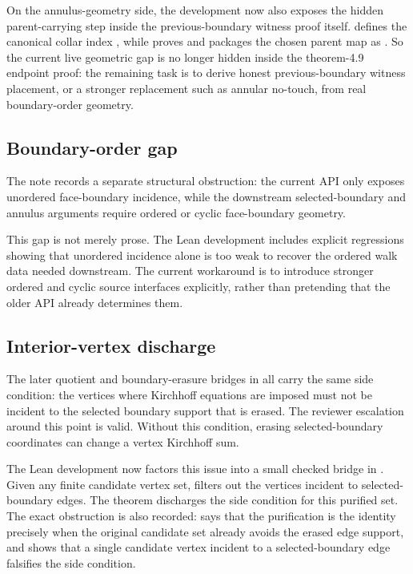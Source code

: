 \documentclass[11pt]{article}
\begin{document}
On the annulus-geometry side, the development now also exposes the hidden
parent-carrying step inside the previous-boundary witness proof itself.
 defines the canonical
collar index
,
while
proves
and packages the chosen parent map as
.
So the current live geometric gap is no longer hidden inside the theorem-4.9
endpoint proof: the remaining task is to derive honest previous-boundary
witness placement, or a stronger replacement such as annular no-touch, from
real boundary-order geometry.

\subsection{Boundary-order gap}

The note
records a separate structural obstruction: the current
 API only exposes unordered face-boundary
incidence, while the downstream selected-boundary and annulus arguments require
ordered or cyclic face-boundary geometry.

This gap is not merely prose.  The Lean development includes explicit
regressions showing that unordered incidence alone is too weak to recover the
ordered walk data needed downstream.  The current workaround is to introduce
stronger ordered and cyclic source interfaces explicitly, rather than pretending
that the older API already determines them.

\subsection{Interior-vertex discharge}

The later quotient and boundary-erasure bridges in
 all carry the same side condition: the
vertices where Kirchhoff equations are imposed must not be incident to the
selected boundary support that is erased.  The reviewer escalation around this
point is valid.  Without this condition, erasing selected-boundary coordinates
can change a vertex Kirchhoff sum.

The Lean development now factors this issue into a small checked bridge in
.  Given any finite candidate vertex set,
 filters out the vertices incident to
selected-boundary edges.  The theorem
discharges the side condition for this purified set.  The exact obstruction is
also recorded:  says that the
purification is the identity precisely when the original candidate set already
avoids the erased edge support, and
 shows that a
single candidate vertex incident to a selected-boundary edge falsifies the side
condition.
\end{document}
